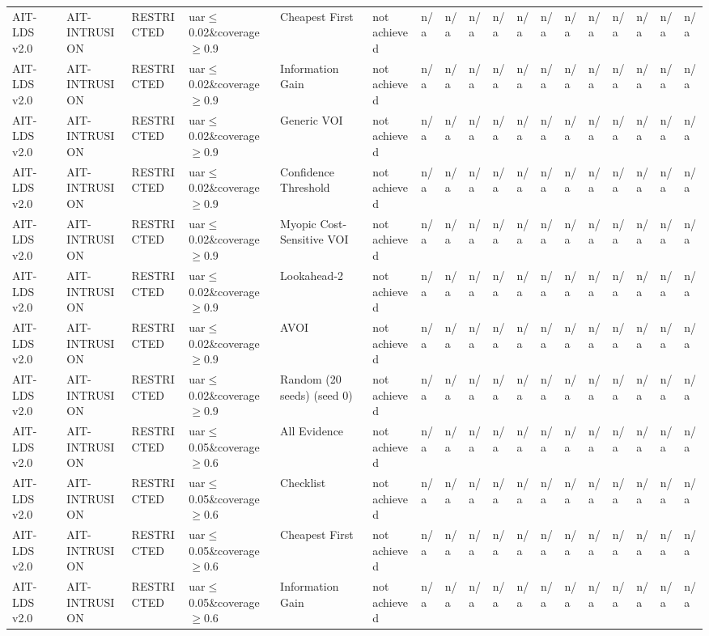\begin{table}[!ht]
{\begin{tabular}{llllllllllllllllll}
AIT-LDS v2.0 & AIT-INTRUSION & RESTRICTED & uar$\le$0.02\&coverage$\ge$0.9 & Cheapest First & not achieved & n/a & n/a & n/a & n/a & n/a & n/a & n/a & n/a & n/a & n/a & n/a & n/a \\
AIT-LDS v2.0 & AIT-INTRUSION & RESTRICTED & uar$\le$0.02\&coverage$\ge$0.9 & Information Gain & not achieved & n/a & n/a & n/a & n/a & n/a & n/a & n/a & n/a & n/a & n/a & n/a & n/a \\
AIT-LDS v2.0 & AIT-INTRUSION & RESTRICTED & uar$\le$0.02\&coverage$\ge$0.9 & Generic VOI & not achieved & n/a & n/a & n/a & n/a & n/a & n/a & n/a & n/a & n/a & n/a & n/a & n/a \\
AIT-LDS v2.0 & AIT-INTRUSION & RESTRICTED & uar$\le$0.02\&coverage$\ge$0.9 & Confidence Threshold & not achieved & n/a & n/a & n/a & n/a & n/a & n/a & n/a & n/a & n/a & n/a & n/a & n/a \\
AIT-LDS v2.0 & AIT-INTRUSION & RESTRICTED & uar$\le$0.02\&coverage$\ge$0.9 & Myopic Cost-Sensitive VOI & not achieved & n/a & n/a & n/a & n/a & n/a & n/a & n/a & n/a & n/a & n/a & n/a & n/a \\
AIT-LDS v2.0 & AIT-INTRUSION & RESTRICTED & uar$\le$0.02\&coverage$\ge$0.9 & Lookahead-2 & not achieved & n/a & n/a & n/a & n/a & n/a & n/a & n/a & n/a & n/a & n/a & n/a & n/a \\
AIT-LDS v2.0 & AIT-INTRUSION & RESTRICTED & uar$\le$0.02\&coverage$\ge$0.9 & AVOI & not achieved & n/a & n/a & n/a & n/a & n/a & n/a & n/a & n/a & n/a & n/a & n/a & n/a \\
AIT-LDS v2.0 & AIT-INTRUSION & RESTRICTED & uar$\le$0.02\&coverage$\ge$0.9 & Random (20 seeds) (seed 0) & not achieved & n/a & n/a & n/a & n/a & n/a & n/a & n/a & n/a & n/a & n/a & n/a & n/a \\
AIT-LDS v2.0 & AIT-INTRUSION & RESTRICTED & uar$\le$0.05\&coverage$\ge$0.6 & All Evidence & not achieved & n/a & n/a & n/a & n/a & n/a & n/a & n/a & n/a & n/a & n/a & n/a & n/a \\
AIT-LDS v2.0 & AIT-INTRUSION & RESTRICTED & uar$\le$0.05\&coverage$\ge$0.6 & Checklist & not achieved & n/a & n/a & n/a & n/a & n/a & n/a & n/a & n/a & n/a & n/a & n/a & n/a \\
AIT-LDS v2.0 & AIT-INTRUSION & RESTRICTED & uar$\le$0.05\&coverage$\ge$0.6 & Cheapest First & not achieved & n/a & n/a & n/a & n/a & n/a & n/a & n/a & n/a & n/a & n/a & n/a & n/a \\
AIT-LDS v2.0 & AIT-INTRUSION & RESTRICTED & uar$\le$0.05\&coverage$\ge$0.6 & Information Gain & not achieved & n/a & n/a & n/a & n/a & n/a & n/a & n/a & n/a & n/a & n/a & n/a & n/a \\

\end{tabular}}
\end{table}
